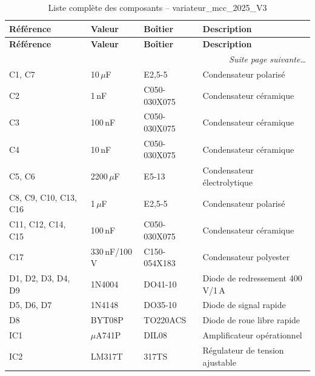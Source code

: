 \documentclass[a4paper,12pt,openany]{book}
\begin{document}
	\begin{longtable}{|p{3.8cm}|p{3cm}|p{3.5cm}|p{5.5cm}|}
		\caption{Liste compl\`ete des composants -- variateur\_mcc\_2025\_V3} \label{tab:bom} \\
		\hline
		\textbf{R\'ef\'erence} & \textbf{Valeur} & \textbf{Bo\^itier} & \textbf{Description} \\
		\hline
		\endfirsthead
		\hline
		\textbf{R\'ef\'erence} & \textbf{Valeur} & \textbf{Bo\^itier} & \textbf{Description} \\
		\hline \endhead
		\hline \multicolumn{4}{r}{\textit{Suite page suivante\ldots}} \\ \endfoot
		\hline \endlastfoot
		C1, C7                        & 10\,$\mu$F      & E2,5-5        & Condensateur polaris\'e \\
		C2                            & 1\,nF           & C050-030X075  & Condensateur c\'eramique \\
		C3                            & 100\,nF         & C050-030X075  & Condensateur c\'eramique \\
		C4                            & 10\,nF          & C050-030X075  & Condensateur c\'eramique \\
		C5, C6                        & 2200\,$\mu$F    & E5-13         & Condensateur \'electrolytique \\
		C8, C9, C10, C13, C16        & 1\,$\mu$F       & E2,5-5        & Condensateur polaris\'e \\
		C11, C12, C14, C15           & 100\,nF         & C050-030X075  & Condensateur c\'eramique \\
		C17                           & 330\,nF/100\,V  & C150-054X183  & Condensateur polyester \\
		\hline
		D1, D2, D3, D4, D9           & 1N4004          & DO41-10       & Diode de redressement 400\,V/1\,A \\
		D5, D6, D7                   & 1N4148          & DO35-10       & Diode de signal rapide \\
		D8                            & BYT08P          & TO220ACS      & Diode de roue libre rapide \\
		\hline
		IC1                           & $\mu$A741P      & DIL08         & Amplificateur op\'erationnel \\
		IC2                           & LM317T          & 317TS         & R\'egulateur de tension ajustable \\

\end{longtable}
\end{document}
